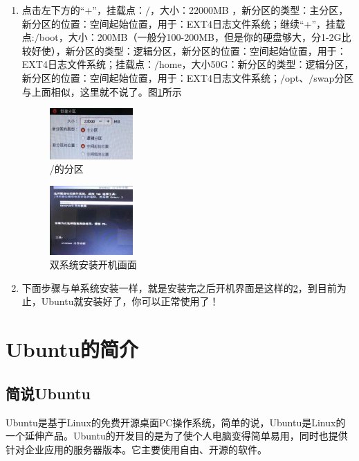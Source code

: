 \documentclass{article}
\begin{document}
\begin{enumerate}
\item 点击左下方的“+”，挂载点：$\slash$，大小：22000MB ，新分区的类型：主分区，新分区的位置：空间起始位置，用于：EXT4日志文件系统；继续“+”，挂载点:$\slash$boot，大小：200MB（一般分100-200MB，但是你的硬盘够大，分1-2G比较好使），新分区的类型：逻辑分区，新分区的位置：空间起始位置，用于：EXT4日志文件系统；挂载点：$\slash$home，大小50G：新分区的类型：逻辑分区，新分区的位置：空间起始位置，用于：EXT4日志文件系统；$\slash$opt、$\slash$swap分区与上面相似，这里就不说了。图\ref{tu24}所示
\begin{figure}[!htb] %
\centering
\includegraphics[width=0.3\textwidth]{tu24.jpeg}
\caption{\small /的分区}
\label{tu24}
\end{figure} 
\begin{figure}[!htb] %
\centering
\includegraphics[width=0.3\textwidth]{tu25.jpeg}
\caption{\small 双系统安装开机画面}
\label{tu25}
\end{figure} 

\item 下面步骤与单系统安装一样，就是安装完之后开机界面是这样的\ref{tu25}，到目前为止，Ubuntu就安装好了，你可以正常使用了！
\end{enumerate}
\section{Ubuntu的简介}
\subsection{简说Ubuntu}
Ubuntu是基于Linux的免费开源桌面PC操作系统，简单的说，Ubuntu是Linux的一个延伸产品。Ubuntu的开发目的是为了使个人电脑变得简单易用，同时也提供针对企业应用的服务器版本。它主要使用自由、开源的软件。
\end{document}
